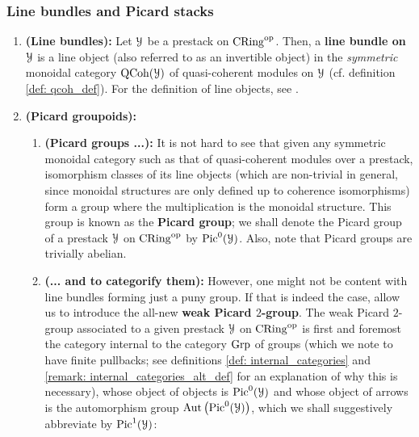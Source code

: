             \subsubsection{Line bundles and Picard stacks}
                \begin{definition} \label{def: line_bundles}
                    \noindent
                    \begin{enumerate}
                        \item \textbf{(Line bundles):} Let $\calY$ be a prestack on $\Cring^{\op}$. Then, a \textbf{line bundle on $\calY$} is a line object (also referred to as an invertible object) in the \textit{symmetric} monoidal category $\QCoh(\calY)$ of quasi-coherent modules on $\calY$ (cf. definition \ref{def: qcoh_def}). For the definition of line objects, see \cite{nlab:line_object}.
                        \item \textbf{(Picard groupoids):} 
                            \begin{enumerate}
                                \item \textbf{(Picard groups ...):} It is not hard to see that given any symmetric monoidal category such as that of quasi-coherent modules over a prestack, isomorphism classes of its line objects (which are non-trivial in general, since monoidal structures are only defined up to coherence isomorphisms) form a group where the multiplication is the monoidal structure. This group is known as the \textbf{Picard group}; we shall denote the Picard group of a prestack $\calY$ on $\Cring^{\op}$ by $\Pic^0(\calY)$. Also, note that Picard groups are trivially abelian.
                                \item \textbf{(... and to categorify them):} However, one might not be content with line bundles forming just a puny group. If that is indeed the case, allow us to introduce the all-new \textbf{weak Picard $2$-group}. The weak Picard $2$-group associated to a given prestack $\calY$ on $\Cring^{\op}$ is first and foremost the category internal to the category $\Grp$ of groups (which we note to have finite pullbacks; see definitions \ref{def: internal_categories} and \ref{remark: internal_categories_alt_def} for an explanation of why this is necessary), whose object of objects is $\Pic^0(\calY)$ and whose object of arrows is the automorphism group $\Aut\left(\Pic^0(\calY)\right)$, which we shall suggestively abbreviate by $\Pic^1(\calY)$:
                                    $$
                                        \begin{tikzcd}

\end{tikzcd}$$
\end{enumerate}
\end{enumerate}
\end{definition}
